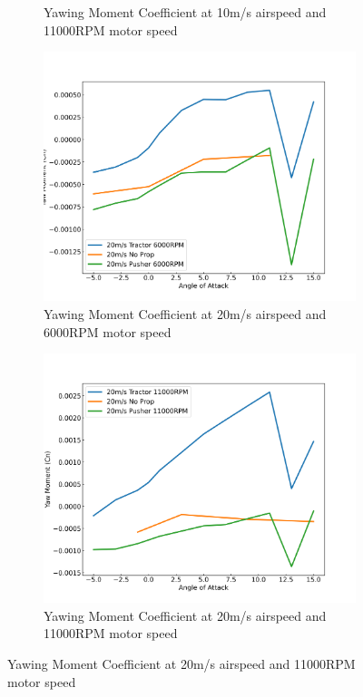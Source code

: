 \begin{figure}[H]
\begin{subfigure}[b]{0.467\textwidth}
        \caption{Yawing Moment Coefficient at 10m/s airspeed and 11000RPM motor speed}
        \label{fig:Cn_10ms_11000}
    \end{subfigure}
    \begin{subfigure}[b]{0.467\textwidth}
        \centering
        \includegraphics[width=\textwidth]{05_Results/Figs/Cn/20ms_6000RPM_Cn.png}
        \caption{Yawing Moment Coefficient at 20m/s airspeed and 6000RPM motor speed}
        \label{fig:Cn_20ms_6000}
    \end{subfigure}
    \begin{subfigure}[b]{0.467\textwidth}
        \centering
        \includegraphics[width=\textwidth]{05_Results/Figs/Cn/20ms_11000RPM_Cn.png}
        \caption{Yawing Moment Coefficient at 20m/s airspeed and 11000RPM motor speed}
        \label{fig:Cn_20ms_11000}
    \end{subfigure}
\end{figure}


